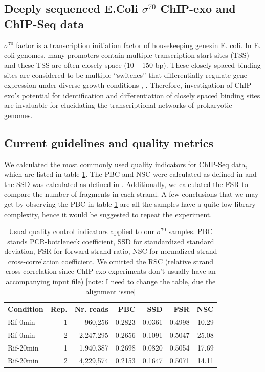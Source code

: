 \documentclass{bmcart}\usepackage[]{graphicx}\usepackage[]{color}
\begin{document}
\subsection{Deeply sequenced E.Coli $\sigma^{70}$ ChIP-exo and ChIP-Seq data}
\label{sec:ourdata}

$\sigma^{70}$ factor is a transcription initiation factor of
housekeeping genesin E. coli. In E. coli genomes, many promoters
contain multiple transcription start sites (TSS) and these TSS are
often closely space (10 ~ 150 bp). These closely spaced binding sites
are considered to be multiple ``switches'' that differentially
regulate gene expression under diverse growth conditions
\cite{regdb_old}, \cite{regulondb}. Therefore, investigation of
ChIP-exo's potential for identification and differentiation of closely
spaced binding sites are invaluable for elucidating the
transcriptional networks of prokaryotic genomes.

\subsection{Current guidelines and quality metrics}
\label{sec:qcnow}

We calculated the most commonly used quality indicators for ChIP-Seq
data, which are listed in table \ref{tab:qcbase}. The PBC and NSC were
calculated as defined in \cite{encode_qc} and the SSD was calculated
as defined in \cite{htseq}. Additionally, we calculated the FSR to
compare the number of fragments in each strand. A few conclusions that
we may get by observing the PBC in table \ref{tab:qcbase} are all the
samples have a quite low library complexity, hence it would be
suggested to repeat the experiment.

\begin{table}[h]
  \centering
\begin{tabular}{l|r|r|r|r|r|r}
\hline\hline
Condition & Rep. & Nr. reads & PBC & SSD & FSR & NSC  \\
\hline\hline
Rif-0min & 1 & 960,256 & 0.2823 & 0.0361 & 0.4998 & 10.29 \\
\hline
Rif-0min & 2 & 2,247,295 & 0.2656 & 0.1091 & 0.5047 &  25.08  \\
\hline
Rif-20min & 1 & 1,940,387 & 0.2698 & 0.0820 & 0.5054 & 17.69  \\
\hline
Rif-20min & 2 & 4,229,574 & 0.2153 & 0.1647 & 0.5071 &  14.11 \\
\hline
\end{tabular}  
\caption{Usual quality control indicators applied to our
  $\sigma^{70}$ samples. PBC stands PCR-bottleneck coefficient, SSD
  for standardized standard deviation, FSR for forward strand ratio,
  NSC for normalized strand cross-correlation coefficient. We
  omitted the RSC (relative strand cross-correlation since ChIP-exo
  experiments don't usually have an accompanying input file) 
  [note: I need to change the table, due the alignment issue]}

  \label{tab:qcbase}
\end{table}
\end{document}
